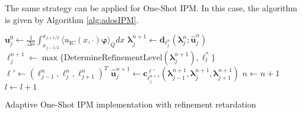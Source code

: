 The same strategy can be applied for One-Shot IPM. In this case, the algorithm is given by Algorithm \ref{alg:adosIPM}.
\begin{algorithm}[H]
\begin{algorithmic}[1]
\State $\bm{u}_j^0 \leftarrow \frac{1}{\Delta x} \int_{x_{j-1/ 2}}^{x_{j+1/ 2}} \langle u_{\text{IC}}(x, \cdot) \bm{\varphi} \rangle_Q dx$
\EndFor
{}
\State $\bm{\lambda}_j^{n+1} \leftarrow \bm{d}_{\ell_j^n}(\bm{\lambda}_{j}^{n};\bm{\hat u}_j^{n})$
\State $\ell_j^{n+1}\leftarrow \max\{\text{DetermineRefinementLevel}\left(\bm{\lambda}_j^{n+1}\right),\ell_l^*\}$
\State $\bm\ell' \leftarrow (\ell_{j-1}^n,\ell_{j}^n,\ell_{j+1}^n)^T$
\State $\bm{\hat u}_j^{n+1} \leftarrow \bm{c}_{\ell_j^{n+1}}^{\bm\ell'}(\bm{\lambda}_{j-1}^{n+1},\bm{\lambda}_j^{n+1},\bm{\lambda}_{j+1}^{n+1})$
\EndFor
\State $n \leftarrow n+1$
\State $l \leftarrow l+1$
\EndIf
\EndWhile
\end{algorithmic}
\caption{Adaptive One-Shot IPM implementation with refinement retardation}
\label{alg:adosIPM}
\end{algorithm}

